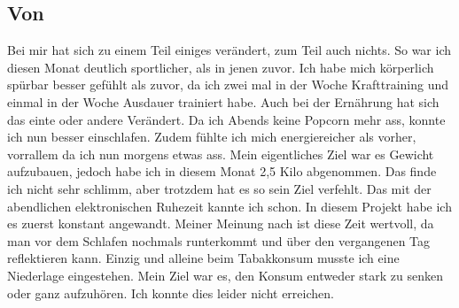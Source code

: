 \subsection{Von \jonas}
\authortoc{\jonas}{\subsectionident}
Bei mir hat sich zu einem Teil einiges verändert, zum Teil auch nichts. So war ich diesen Monat deutlich sportlicher, als in jenen zuvor. Ich habe mich körperlich spürbar besser gefühlt als zuvor, da ich zwei mal in der Woche Krafttraining und einmal in der Woche Ausdauer trainiert habe.
\newline
Auch bei der Ernährung hat sich das einte oder andere Verändert. Da ich Abends keine Popcorn mehr ass, konnte ich nun besser einschlafen. Zudem fühlte ich mich energiereicher als vorher, vorrallem da ich nun morgens etwas ass. Mein eigentliches Ziel war es Gewicht aufzubauen, jedoch habe ich in diesem Monat 2,5 Kilo abgenommen. Das finde ich nicht sehr schlimm, aber trotzdem hat es so sein Ziel verfehlt.
\newline
Das mit der abendlichen elektronischen Ruhezeit kannte ich schon. In diesem Projekt habe ich es zuerst konstant angewandt. Meiner Meinung nach ist diese Zeit wertvoll, da man vor dem Schlafen nochmals runterkommt und über den vergangenen Tag reflektieren kann.
\newline
\newline
Einzig und alleine beim Tabakkonsum musste ich eine Niederlage eingestehen. Mein Ziel war es, den Konsum entweder stark zu senken oder ganz aufzuhören. Ich konnte dies leider nicht erreichen.